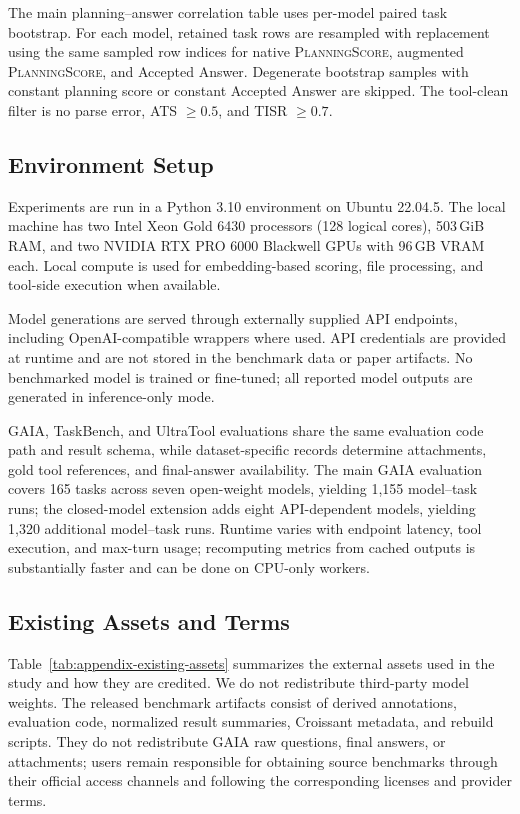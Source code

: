 \documentclass{article}
\providecommand{\metric}[1]{\textsc{#1}}
\begin{document}
The main planning--answer correlation table uses per-model paired task bootstrap. For each model, retained task rows are resampled with replacement using the same sampled row indices for native \metric{PlanningScore}, augmented \metric{PlanningScore}, and Accepted Answer. Degenerate bootstrap samples with constant planning score or constant Accepted Answer are skipped. The tool-clean filter is no parse error, ATS $\ge 0.5$, and TISR $\ge 0.7$.


\subsection{Environment Setup}
\label{sec:appendix-environment}

Experiments are run in a Python 3.10 environment on Ubuntu 22.04.5.
The local machine has two Intel Xeon Gold 6430 processors (128 logical cores),
503\,GiB RAM, and two NVIDIA RTX PRO 6000 Blackwell GPUs with 96\,GB VRAM each.
Local compute is used for embedding-based scoring, file processing, and
tool-side execution when available.

Model generations are served through externally supplied API endpoints, including
OpenAI-compatible wrappers where used. API credentials are provided at runtime
and are not stored in the benchmark data or paper artifacts. No benchmarked
model is trained or fine-tuned; all reported model outputs are generated in
inference-only mode.

GAIA, TaskBench, and UltraTool evaluations share the same evaluation code path
and result schema, while dataset-specific records determine attachments, gold
tool references, and final-answer availability. The main GAIA evaluation covers
165 tasks across seven open-weight models, yielding 1{,}155 model--task runs;
the closed-model extension adds eight API-dependent models, yielding 1{,}320
additional model--task runs. Runtime varies with endpoint latency, tool
execution, and max-turn usage; recomputing metrics from cached outputs is
substantially faster and can be done on CPU-only workers.


\subsection{Existing Assets and Terms}
\label{subsec:appendix-existing-assets}

Table~\ref{tab:appendix-existing-assets} summarizes the external assets used in
the study and how they are credited. We do not redistribute third-party model
weights. The released benchmark artifacts consist of derived annotations,
evaluation code, normalized result summaries, Croissant metadata, and rebuild
scripts. They do not redistribute GAIA raw questions, final answers, or
attachments; users remain responsible for obtaining source benchmarks through
their official access channels and following the corresponding licenses and
provider terms.
\end{document}
